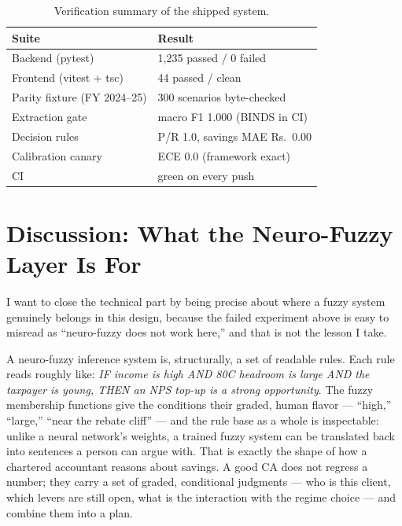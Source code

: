 \documentclass[conference]{IEEEtran}
\newcommand{\thead}[1]{\textbf{#1}}
\newcommand{\Rs}{Rs.~}
\begin{document}
\begin{table}[t]
\caption{Verification summary of the shipped system.}
\label{tab:ver}
\centering
\footnotesize
\begin{tabular}{@{}ll@{}}
\toprule
\rowcolor{black!6}
\thead{Suite} & \thead{Result} \\
\midrule
Backend (pytest) & 1{,}235 passed / 0 failed \\
Frontend (vitest + tsc) & 44 passed / clean \\
Parity fixture (FY 2024--25) & 300 scenarios byte-checked \\
Extraction gate & macro F1 1.000 (BINDS in CI) \\
Decision rules & P/R 1.0, savings MAE \Rs{}0.00 \\
Calibration canary & ECE 0.0 (framework exact) \\
CI & green on every push \\
\bottomrule
\end{tabular}
\end{table}

\section{Discussion: What the Neuro-Fuzzy Layer Is For}
I want to close the technical part by being precise about where a
fuzzy system genuinely belongs in this design, because the failed
experiment above is easy to misread as ``neuro-fuzzy does not work
here,'' and that is not the lesson I take.

A neuro-fuzzy inference system is, structurally, a set of readable
rules. Each rule reads roughly like: \emph{IF income is high AND 80C
headroom is large AND the taxpayer is young, THEN an NPS top-up is a
strong opportunity}. The fuzzy membership functions give the
conditions their graded, human flavor --- ``high,'' ``large,'' ``near
the rebate cliff'' --- and the rule base as a whole is inspectable:
unlike a neural network's weights, a trained fuzzy system can be
translated back into sentences a person can argue with. That is exactly
the shape of how a chartered accountant reasons about savings. A good
CA does not regress a number; they carry a set of graded, conditional
judgments --- who is this client, which levers are still open, what is
the interaction with the regime choice --- and combine them into a
plan.
\end{document}
